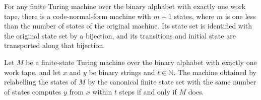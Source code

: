 \begin{definition}
\label{Turing.FinTM.toCodeTM}
\leanok
{}
For any finite Turing machine over the binary alphabet with exactly one work tape, there
is a code-normal-form machine with $m+1$ states, where $m$ is one less than the number
of states of the original machine. Its state set is identified with the original state
set by a bijection, and its transitions and initial state are transported along that
bijection.
\end{definition}

\begin{theorem}
\label{Turing.FinTM.toCodeTM_computesInTime_iff}
\leanok
{}
Let $M$ be a finite-state Turing machine over the binary alphabet with exactly one work
tape, and let $x$ and $y$ be binary strings and $t\in\mathbb{N}$. The machine obtained
by relabelling the states of $M$ by the canonical finite state set with the same number
of states computes $y$ from $x$ within $t$ steps if and only if $M$ does.
\end{theorem}
